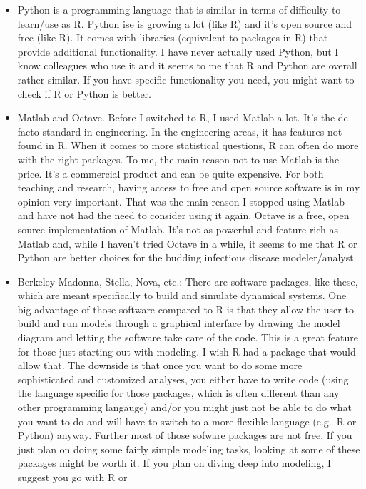 \documentclass[]{book}
\theoremstyle{definition}
\theoremstyle{definition}
\theoremstyle{definition}
\theoremstyle{remark}
\begin{document}
\begin{itemize}
\item
  Python is a programming language that is similar in terms of
  difficulty to learn/use as R. Python ise is growing a lot (like R) and
  it's open source and free (like R). It comes with libraries
  (equivalent to packages in R) that provide additional functionality. I
  have never actually used Python, but I know colleagues who use it and
  it seems to me that R and Python are overall rather similar. If you
  have specific functionality you need, you might want to check if R or
  Python is better.
\item
  Matlab and Octave. Before I switched to R, I used Matlab a lot. It's
  the de-facto standard in engineering. In the engineering areas, it has
  features not found in R. When it comes to more statistical questions,
  R can often do more with the right packages. To me, the main reason
  not to use Matlab is the price. It's a commercial product and can be
  quite expensive. For both teaching and research, having access to free
  and open source software is in my opinion very important. That was the
  main reason I stopped using Matlab - and have not had the need to
  consider using it again. Octave is a free, open source implementation
  of Matlab. It's not as powerful and feature-rich as Matlab and, while
  I haven't tried Octave in a while, it seems to me that R or Python are
  better choices for the budding infectious disease modeler/analyst.
\item
  Berkeley Madonna, Stella, Nova, etc.: There are software packages,
  like these, which are meant specifically to build and simulate
  dynamical systems. One big advantage of those software compared to R
  is that they allow the user to build and run models through a
  graphical interface by drawing the model diagram and letting the
  software take care of the code. This is a great feature for those just
  starting out with modeling. I wish R had a package that would allow
  that. The downside is that once you want to do some more sophisticated
  and customized analyses, you either have to write code (using the
  language specific for those packages, which is often different than
  any other programming langauge) and/or you might just not be able to
  do what you want to do and will have to switch to a more flexible
  language (e.g.~R or Python) anyway. Further most of those sofware
  packages are not free. If you just plan on doing some fairly simple
  modeling tasks, looking at some of these packages might be worth it.
  If you plan on diving deep into modeling, I suggest you go with R or

\end{itemize}
\end{document}
